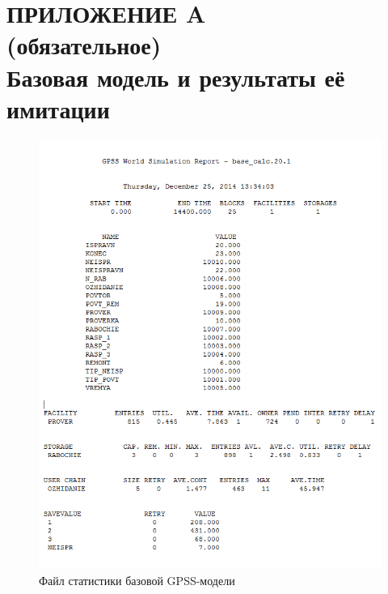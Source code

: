 \renewcommand{\thefigure}{\Asbuk{section}.\arabic{figure}}
\renewcommand{\thetable}{\Asbuk{section}.\arabic{table}}
\renewcommand{\thelstlisting}{\Asbuk{section}.\arabic{lstlisting}}

\section*{ПРИЛОЖЕНИЕ A \\
  (обязательное) \\
  Базовая модель и результаты её имитации}
\label{sec:appendix_a}

\pagestyle{fancy}
\fancyhf{}  %
\fancyfoot[R]{\thepage}
\renewcommand{\headrulewidth}{0pt}
\renewcommand{\footrulewidth}{0pt}

\setlength{\headheight}{10mm}
\setlength{\headsep}{\baselineskip}

\thispagestyle{plain}

\setcounter{section}{1}
\setcounter{figure}{0}
\setcounter{table}{0}
\setcounter{lstlisting}{0}



\begin{figure}[h!]
  \centering
  \includegraphics[width=150mm]{pic/base_report}
  \caption{Файл статистики базовой GPSS-модели}
  \label{pic:base_report}
\end{figure}
